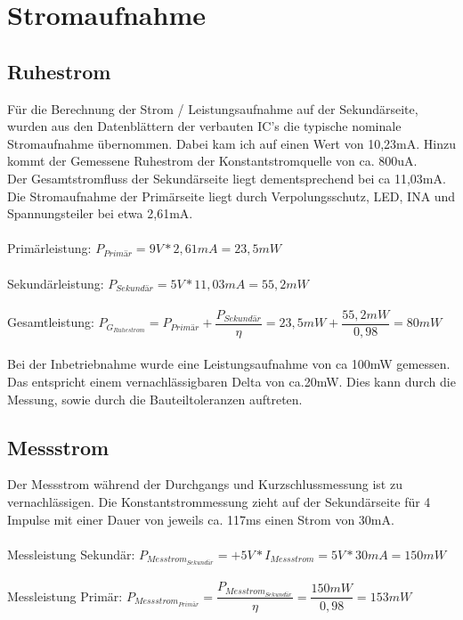 \section{Stromaufnahme}

\subsection{Ruhestrom}
Für die Berechnung der Strom / Leistungsaufnahme auf der Sekundärseite, wurden aus den Datenblättern der verbauten IC's die typische nominale Stromaufnahme übernommen. Dabei kam ich auf einen Wert von 10,23mA. Hinzu kommt der Gemessene Ruhestrom der Konstantstromquelle von ca. 800uA. 
\\
Der Gesamtstromfluss der Sekundärseite liegt dementsprechend bei ca 11,03mA.
\\
Die Stromaufnahme der Primärseite liegt durch Verpolungsschutz, LED, INA und Spannungsteiler bei etwa 2,61mA. 
\\
\\
Primärleistung: $P_{Primär} = 9V * 2,61mA = 23,5mW$
\\
\\
Sekundärleistung: $P_{Sekundär} = 5V * 11,03mA = 55,2mW$
\\
\\
Gesamtleistung: $P_{G_{Ruhestrom}} = P_{Primär} + \dfrac{P_{Sekundär}}{\eta} = 23,5mW + \dfrac{55,2mW}{0,98} = 80mW$
\\
\\
Bei der Inbetriebnahme wurde eine Leistungsaufnahme von ca 100mW gemessen. Das entspricht einem vernachlässigbaren Delta von ca.20mW. Dies kann durch die Messung, sowie durch die Bauteiltoleranzen auftreten.

\subsection{Messstrom}

Der Messstrom während der Durchgangs und Kurzschlussmessung ist zu vernachlässigen. Die Konstantstrommessung zieht auf der Sekundärseite für 4 Impulse mit einer Dauer von jeweils ca. 117ms einen Strom von 30mA.
\\
\\
Messleistung Sekundär: $P_{Messtrom_{Sekundär}} = +5V * I_{Messstrom} = 5V * 30mA = 150mW$
\\
\\
Messleistung Primär: $P_{Messstrom_{Primär}} = \dfrac{P_{Messtrom_{Sekundär}}}{\eta} = \dfrac{150mW}{0,98} = 153mW$

